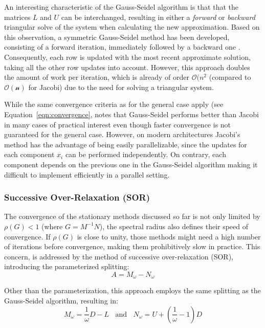 \noindent An interesting characteristic of the Gauss-Seidel algorithm is that that the matrices $L$ and $U$ can be interchanged, resulting in either a \textit{forward} or \textit{backward} triangular solve of the system when calculating the new approximation. Based on this observation, a symmetric Gauss-Seidel method has been developed, consisting of a forward iteration, immediately followed by a backward one \cite{saad_iterative_2003}. Consequently, each row is updated with the most recent approximate solution, taking all the other row updates into account. However, this approach doubles the amount of work per iteration, which is already of order $\mathcal{O}(n^2$ (compared to $\mathcal{O(n)}$ for Jacobi) due to the need for solving a triangular system. 

While the same convergence criteria as for the general case apply (see Equation~\hyperref[eqn:convergence]{\ref{eqn:convergence}}, \cite{venit_convergence_1975} notes that Gauss-Seidel performs better than Jacobi in many cases of practical interest even though faster convergence is not guaranteed for the general case. However, on modern architectures Jacobi's method has the advantage of being easily parallelizable, since the updates for each component $x_i$ can be performed independently. On contrary, each component depends on the previous one in the Gauss-Seidel algorithm making it difficult to implement efficiently in a parallel setting.

\subsubsection{Successive Over-Relaxation (SOR)}
The convergence of the stationary methods discussed so far is not only limited by $\rho(G)<1$ (where $G=M^{-1}N$), the spectral radius also defines their speed of convergence. If $\rho(G)$ is close to unity, those methods might need a high number of iterations before convergence, making them prohibitively slow in practice. This concern, is addressed by the method of successive over-relaxation (SOR), introducing the parameterized splitting:
\begin{equation}
    A=M_\omega - N_\omega
\end{equation}

\noindent Other than the parameterization, this approach employs the same splitting as the Gauss-Seidel algorithm, resulting in:
\begin{equation}
    M_\omega=\frac{1}\omega{}D-L \;\;\text{ and } \;\; N_\omega=U+\left(\frac{1}{\omega}-1\right)D
\end{equation}

